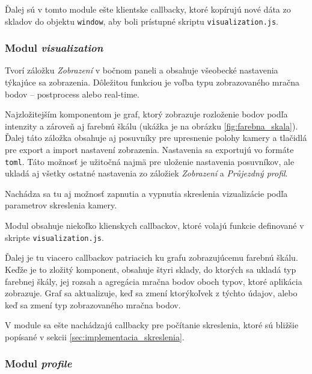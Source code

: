 Ďalej sú v tomto module ešte klientske callbacky, ktoré kopírujú nové dáta zo skladov do objektu \texttt{window}, aby boli prístupné skriptu \texttt{visualization.js}.

\subsubsection{Modul \emph{visualization} }

Tvorí záložku \emph{Zobrazení} v bočnom paneli a obsahuje všeobecké nastavenia týkajúce sa zobrazenia. Dôležitou funkciou je voľba typu zobrazovaného mračna bodov -- postprocess alebo real-time.

Najzložitejším komponentom je graf, ktorý zobrazuje rozloženie bodov podľa intenzity a zároveň aj farebnú škálu (ukážka je na obrázku \ref{fig:farebna_skala}). Ďalej táto záložka obsahuje aj posuvníky pre upresnenie polohy kamery a tlačidlá pre export a import nastavení zobrazenia. Nastavenia sa exportujú vo formáte \texttt{toml}. Táto možnosť je užitočná najmä pre uloženie nastavenia posuvníkov, ale ukladá aj všetky ostatné nastavenia zo záložiek \emph{Zobrazení} a \emph{Průjezdný profil}.

Nachádza sa tu aj možnosť zapnutia a vypnutia skreslenia vizualizácie podľa parametrov skreslenia kamery.

Modul obsahuje niekoľko klienskych callbackov, ktoré volajú funkcie definované v skripte \texttt{visualization.js}.

Ďalej je tu viacero callbackov patriacich ku grafu zobrazujúcemu farebnú škálu. Keďže je to zložitý komponent, obsahuje štyri sklady, do ktorých sa ukladá typ farebnej škály, jej rozsah a agregácia mračna bodov oboch typov, ktoré aplikácia zobrazuje. Graf sa aktualizuje, keď sa zmení ktorýkoľvek z týchto údajov, alebo keď sa zmení typ zobrazovaného mračna bodov.

V module sa ešte nachádzajú callbacky pre počítanie skreslenia, ktoré sú bližšie popísané v sekcii \ref{sec:implementacia_skreslenia}.

\subsubsection{Modul \emph{profile} }

